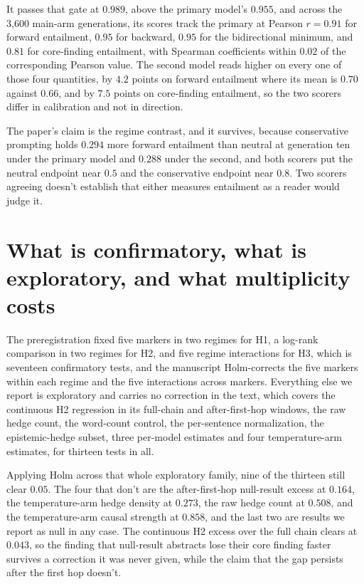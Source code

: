 \documentclass{article}
\begin{document}
It passes that gate at $0.989$, above the primary model's $0.955$, and across the 3{,}600 main-arm generations, its scores track the primary at Pearson $r = 0.91$ for forward entailment, $0.95$ for backward, $0.95$ for the bidirectional minimum, and $0.81$ for core-finding entailment, with Spearman coefficients within $0.02$ of the corresponding Pearson value. The second model reads higher on every one of those four quantities, by $4.2$ points on forward entailment where its mean is $0.70$ against $0.66$, and by $7.5$ points on core-finding entailment, so the two scorers differ in calibration and not in direction.

The paper's claim is the regime contrast, and it survives, because conservative prompting holds $0.294$ more forward entailment than neutral at generation ten under the primary model and $0.288$ under the second, and both scorers put the neutral endpoint near $0.5$ and the conservative endpoint near $0.8$. Two scorers agreeing doesn't establish that either measures entailment as a reader would judge it.

\section{What is confirmatory, what is exploratory, and what multiplicity costs}
\label{app:multiplicity}

The preregistration fixed five markers in two regimes for H1, a log-rank comparison in two regimes for H2, and five regime interactions for H3, which is seventeen confirmatory tests, and the manuscript Holm-corrects the five markers within each regime and the five interactions across markers. Everything else we report is exploratory and carries no correction in the text, which covers the continuous H2 regression in its full-chain and after-first-hop windows, the raw hedge count, the word-count control, the per-sentence normalization, the epistemic-hedge subset, three per-model estimates and four temperature-arm estimates, for thirteen tests in all.

Applying Holm across that whole exploratory family, nine of the thirteen still clear $0.05$. The four that don't are the after-first-hop null-result excess at $0.164$, the temperature-arm hedge density at $0.273$, the raw hedge count at $0.508$, and the temperature-arm causal strength at $0.858$, and the last two are results we report as null in any case. The continuous H2 excess over the full chain clears at $0.043$, so the finding that null-result abstracts lose their core finding faster survives a correction it was never given, while the claim that the gap persists after the first hop doesn't.
\end{document}

